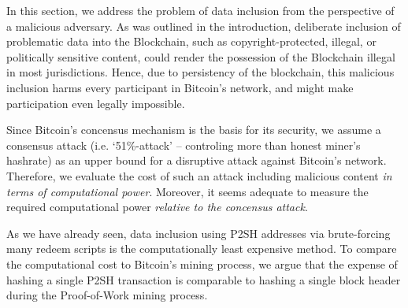 \documentclass[10pt,a4paper,twocolumn]{article}
\begin{document}
In this section, we address the problem of data inclusion from the perspective of a malicious adversary.
As was outlined in the introduction, deliberate inclusion of problematic data into the Blockchain, such as copyright-protected, illegal, or politically sensitive content, could render the possession of the Blockchain illegal in most jurisdictions.
Hence, due to persistency of the blockchain, this malicious inclusion harms every participant in Bitcoin's network, and might make participation even legally impossible.

Since Bitcoin's concensus mechanism is the basis for its security, we assume a consensus attack (i.e. \enquote*{51\%-attack} – controling more than honest miner's hashrate) as an upper bound for a disruptive attack against Bitcoin's network.
Therefore, we evaluate the cost of such an attack including malicious content \emph{in terms of computational power}.
Moreover, it seems adequate to measure the required computational power \emph{relative to the concensus attack}.

As we have already seen, data inclusion using {P2SH} addresses via brute-forcing many redeem scripts is the computationally least expensive method.
To compare the computational cost to Bitcoin's mining process, we argue that the expense of hashing a single {P2SH} transaction is comparable to hashing a single block header during the Proof-of-Work mining process.


\end{document}
